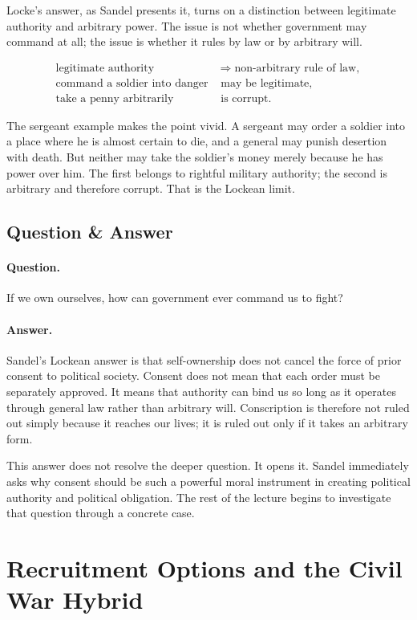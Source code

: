 Locke's answer, as Sandel presents it, turns on a distinction between legitimate authority and arbitrary power. The issue is not whether government may command at all; the issue is whether it rules by law or by arbitrary will.

\begin{align}
\text{legitimate authority} &\Longrightarrow \text{non-arbitrary rule of law},\\
\text{command a soldier into danger} &\text{ may be legitimate},\\
\text{take a penny arbitrarily} &\text{ is corrupt.}
\end{align}

The sergeant example makes the point vivid. A sergeant may order a soldier into a place where he is almost certain to die, and a general may punish desertion with death. But neither may take the soldier's money merely because he has power over him. The first belongs to rightful military authority; the second is arbitrary and therefore corrupt. That is the Lockean limit.

\subsection{Question \& Answer}

\paragraph{Question.} If we own ourselves, how can government ever command us to fight?

\paragraph{Answer.} Sandel's Lockean answer is that self-ownership does not cancel the force of prior consent to political society. Consent does not mean that each order must be separately approved. It means that authority can bind us so long as it operates through general law rather than arbitrary will. Conscription is therefore not ruled out simply because it reaches our lives; it is ruled out only if it takes an arbitrary form.

This answer does not resolve the deeper question. It opens it. Sandel immediately asks why consent should be such a powerful moral instrument in creating political authority and political obligation. The rest of the lecture begins to investigate that question through a concrete case.

\section{Recruitment Options and the Civil War Hybrid}

